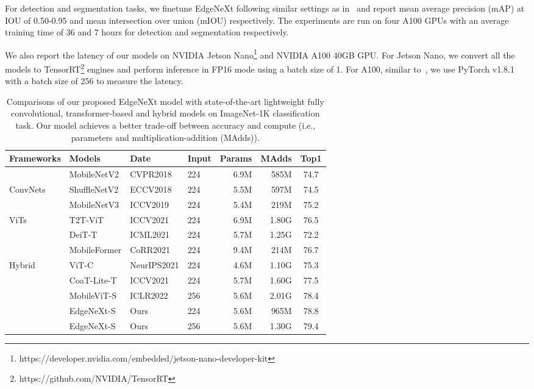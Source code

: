 \documentclass[runningheads]{llncs}
\renewcommand\arraystretch{1.0}
\begin{document}
For detection and segmentation tasks, we finetune EdgeNeXt following similar settings as in~\cite{MobileViT} and report mean average precision (mAP) at IOU of
0.50-0.95 and mean intersection over union (mIOU) respectively. The experiments are run on four A100 GPUs with an average training time of 36 and 7 hours for detection and segmentation respectively.

We also report the latency of our models on NVIDIA Jetson Nano\footnote{https://developer.nvidia.com/embedded/jetson-nano-developer-kit} and NVIDIA A100 40GB GPU. For Jetson Nano, we convert all the models to TensorRT\footnote{https://github.com/NVIDIA/TensorRT} engines and perform inference in FP16 mode using a batch size of 1. For A100, similar to~\cite{ConvNeXt}, we use PyTorch v1.8.1 with a batch size of 256 to measure the latency.
\begin{table*}[!t]
\small
\setlength{\tabcolsep}{6pt}
\renewcommand\arraystretch{1.0}
\caption{Comparisons of our proposed EdgeNeXt model with state-of-the-art lightweight fully convolutional, transformer-based and hybrid models on ImageNet-1K classification task. 
Our model achieves a better trade-off between accuracy and compute (i.e., parameters and multiplication-addition (MAdds)).}
\begin{center}
\begin{tabular}{l l l l r r c}
\toprule
\rowcolor{Gray} Frameworks  &   Models     &   Date  & Input &  Params  & MAdds &   Top1  \\
\midrule
                     &  MobileNetV2  &  CVPR2018  & 224 &  6.9M & 585M & 74.7 \\
ConvNets         &  ShuffleNetV2 &  ECCV2018  & 224 & 5.5M & 597M & 74.5 \\
                     &  MobileNetV3  &  ICCV2019  & 224 & 5.4M & 219M & 75.2 \\
\midrule
ViTs                 &  T2T-ViT                   &  ICCV2021  & 224 & 6.9M & 1.80G & 76.5 \\
                     &  DeiT-T                    &  ICML2021  & 224 & 5.7M & 1.25G & 72.2 \\
\midrule
                     &  MobileFormer              &  CoRR2021 & 224 & 9.4M & 214M & 76.7 \\
Hybrid               &  ViT-C                     &  NeurIPS2021 & 224 & 4.6M & 1.10G & 75.3 \\
                     &  CoaT-Lite-T               &  ICCV2021  & 224 & 5.7M & 1.60G  & 77.5 \\
                     &  MobileViT-S               &  ICLR2022  & 256 & 5.6M & 2.01G  & 78.4 \\
\cmidrule{2-7}
\rowcolor{orange!6}  &  EdgeNeXt-S              &  Ours          & 224 & 5.6M & 965M & 78.8 \\
\rowcolor{orange!6}  &  EdgeNeXt-S              &  Ours          & 256 & 5.6M & 1.30G & 79.4 \\
\bottomrule 
\end{tabular}
\label{IN:tab1}
\end{center}
\end{table*}
\end{document}
